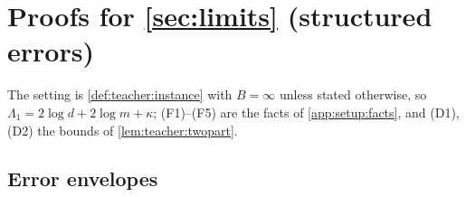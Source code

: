 \section{Proofs for \texorpdfstring{\cref{sec:limits}}{Section \ref*{sec:limits}} (structured errors)}\label{app:limits}

The setting is \cref{def:teacher:instance} with $B=\infty$ unless stated otherwise, so $\Lambda_1=2\log d+2\log m+\kappa$; (F1)--(F5) are the facts of \cref{app:setup:facts}, and (D1), (D2) the bounds of \cref{lem:teacher:twopart}.

\subsection{Error envelopes}\label{app:limits:envelope}

